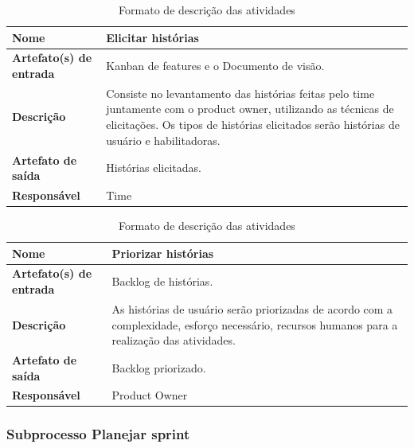 \begin{table}[h]
    \centering
    \label{descricaoAtividades}
    \caption{Formato de descrição das atividades}
        \begin{tabular}{|l|p{10cm}|}
        \hline
        \textbf{Nome} & Elicitar histórias \\
        \hline
        \textbf{Artefato(s) de entrada} & Kanban de features e o Documento de visão. \\
        \hline
        \textbf{Descrição} & Consiste no levantamento das histórias feitas pelo time juntamente com o product owner, utilizando as técnicas de elicitações. Os tipos de histórias elicitados serão histórias de usuário e habilitadoras. \\
        \hline
        \textbf{Artefato de saída} & Histórias elicitadas. \\
        \hline
        \textbf{Responsável} & Time \\
        \hline
    \end{tabular}
\end{table}

\begin{table}[h]
    \centering
    \label{descricaoAtividades}
    \caption{Formato de descrição das atividades}
        \begin{tabular}{|l|p{10cm}|}
        \hline
        \textbf{Nome} & Priorizar histórias \\
        \hline
        \textbf{Artefato(s) de entrada} & Backlog de histórias. \\
        \hline
        \textbf{Descrição} & As histórias de usuário serão priorizadas de acordo com a complexidade, esforço necessário, recursos humanos para a realização das atividades. \\
        \hline
        \textbf{Artefato de saída} & Backlog priorizado. \\
        \hline
        \textbf{Responsável} & Product Owner \\
        \hline
    \end{tabular}
\end{table}

\subsubsection{Subprocesso Planejar sprint}

